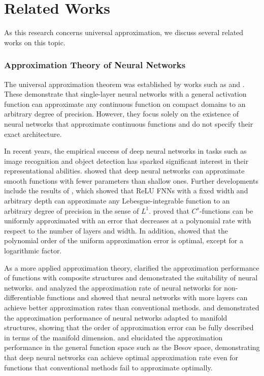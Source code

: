 \section{Related Works}
As this research concerns universal approximation, we discuss several related works on this topic.

\subsubsection{Approximation Theory of Neural Networks}
The universal approximation theorem was established by works such as \cite{Cyb89} and \cite{Hor91}. These demonstrate that single-layer neural networks with a general activation function can approximate any continuous function on compact domains to an arbitrary degree of precision. However, they focus solely on the existence of neural networks that approximate continuous functions and do not specify their exact architecture.

In recent years, the empirical success of deep neural networks in tasks such as image recognition and object detection has sparked significant interest in their representational abilities. \cite{Yar17} showed that deep neural networks can approximate smooth functions with fewer parameters than shallow ones. Further developments include the results of \cite{Lu17}, which showed that ReLU FNNs with a fixed width and arbitrary depth can approximate any Lebesgue-integrable function to an arbitrary degree of precision in the sense of \(L^1\). \cite{Lu21} proved that \(C^s\)-functions can be uniformly approximated with an error that decreases at a polynomial rate with respect to the number of layers and width. In addition, \cite{Lu21} showed that the polynomial order of the uniform approximation error is optimal, except for a logarithmic factor.

As a more applied approximation theory, \cite{schmidt2017nonparametric} clarified the approximation performance of functions with composite structures and demonstrated the suitability of neural networks. \cite{petersen2018optimal} and \cite{imaizumi2018deep,imaizumi2022advantage} analyzed the approximation rate of neural networks for non-differentiable functions and showed that neural networks with more layers can achieve better approximation rates than conventional methods.
\cite{nakada2020adaptive} and \cite{chen2019efficient} demonstrated the approximation performance of neural networks adapted to manifold structures, showing that the order of approximation error can be fully described in terms of the manifold dimension. \cite{suzuki2018adaptivity} and \cite{hayakawa2020minimax} elucidated the approximation performance in the general function space such as the Besov space, demonstrating that deep neural networks can achieve optimal approximation rate even for functions that conventional methods fail to approximate optimally.

